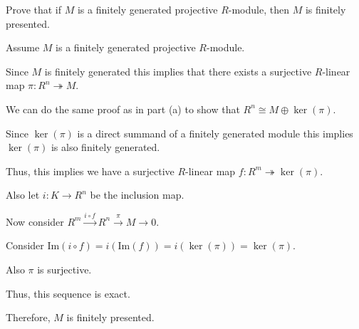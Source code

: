 \documentclass[12pt, letterpaper]{article}
\begin{document}
\begin{subproblem}{}
    Prove that if $M$ is a finitely generated projective $R$-module, then $M$ is finitely presented.
\end{subproblem}
\begin{problemproof}
    Assume $M$ is a finitely generated projective $R$-module.

    Since $M$ is finitely generated this implies that there exists a 
    surjective $R$-linear map $\pi: R^n \twoheadrightarrow M$.

    We can do the same proof as in part (a) to show that $R^n \cong M \oplus \ker(\pi)$.

    Since $\ker(\pi)$ is a direct summand of a finitely generated module this implies $\ker(\pi)$ is also finitely generated.

    Thus, this implies we have a surjective $R$-linear map $f : R^m \twoheadrightarrow \ker(\pi)$.

    Also let $i : K \to R^n$ be the inclusion map.

    Now consider $R^m \overset{i \circ f}{\to} R^n \overset{\pi}{\to} M \to 0$.

    Consider $\mathrm{Im}(i \circ f) = i(\mathrm{Im}(f))=i(\ker(\pi))=\ker(\pi)$.

    Also $\pi$ is surjective.

    Thus, this sequence is exact.

    Therefore, $M$ is finitely presented.
\end{problemproof}
\end{document}
